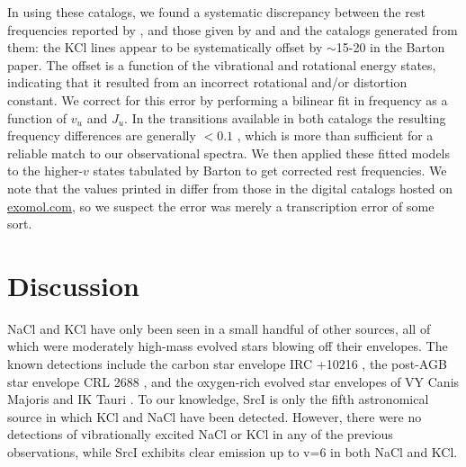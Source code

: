 \documentclass[twocolumn]{aastex62}
\newcommand{\sourcei}{SrcI\xspace}
\begin{document}
In using these catalogs,
we found a systematic discrepancy %
between the rest frequencies
reported by \citet{Barton2014a}, and those given by \citet{Caris2004a} and
\citet{Caris2002a} and the catalogs generated from them: the KCl lines appear
to be systematically offset by $\sim$15-20 \kms in the Barton paper. The offset is a function of
the vibrational
and rotational energy states, indicating that it resulted from an incorrect rotational
and/or distortion constant.  We correct for this error by performing a bilinear fit
in frequency as a function of $v_u$ and $J_u$.  In the transitions available
in both catalogs
the resulting frequency differences are generally $<0.1$ \kms, which is more than 
sufficient for a reliable match to our observational spectra.  We then applied
these fitted models to the higher-$v$ states tabulated by Barton to get corrected rest frequencies.
We note that the values printed in \citet{Barton2014a} differ from those in the digital
catalogs hosted on \url{exomol.com}, so we suspect the error was merely a transcription
error of some sort.










\section{Discussion}
NaCl and KCl have only been seen in a small handful of other sources, all of
which were moderately high-mass evolved stars blowing off their envelopes.  The
known detections include the carbon star envelope IRC +10216
\citep{Cernicharo1987a,Agundez2012a}, the post-AGB star envelope CRL 2688
\citep{Highberger2003a}, and the oxygen-rich evolved star envelopes of VY Canis
Majoris and IK Tauri \citep{Milam2007a}. To our knowledge, \sourcei is only the
fifth astronomical source in which KCl and NaCl have been detected.  However,
there were no detections of vibrationally excited NaCl or KCl in any of the
previous observations,
while \sourcei exhibits clear emission up to v=6 in both NaCl and KCl.
\end{document}
